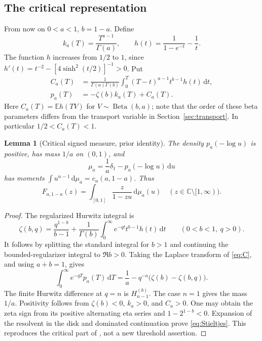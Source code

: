 \documentclass[11pt]{article}
\numberwithin{equation}{section}
\newtheorem{lemma}[theorem]{Lemma}
\theoremstyle{definition}\newtheorem{definition}[theorem]{Definition}
\theoremstyle{remark}\newtheorem{remark}[theorem]{Remark}
\newcommand{\dd}{\,\mathrm d}
\newcommand{\C}{\mathbb C}
\newcommand{\E}{\mathbb E}
\newcommand{\cut}{\C\setminus[1,\infty)}
\DeclareMathOperator{\Beta}{Beta}
\begin{document}
\subsection{The critical representation}
From now on $0<a<1$, $b=1-a$. Define
\begin{equation}\label{eq:hka}
 k_a(T)=\frac{T^{a-1}}{\Gamma(a)},\qquad
 h(t)=\frac1{1-e^{-t}}-\frac1t.
\end{equation}
The function $h$ increases from $1/2$ to $1$, since
$h'(t)=t^{-2}-[4\sinh^2(t/2)]^{-1}>0$.
Put
\begin{align}
 C_a(T)&=\frac1{\Gamma(a)\Gamma(b)}
       \int_0^T(T-t)^{a-1}t^{b-1}h(t)\dd t,
       \label{eq:C}\\
 p_a(T)&=-\zeta(b)k_a(T)+C_a(T).
       \label{eq:p}
\end{align}
Here $C_a(T)=\E h(TV)$ for $V\sim\Beta(b,a)$; note that the order of
these beta parameters differs from the transport variable in
Section~\ref{sec:transport}. In particular $1/2<C_a(T)<1$.

\begin{lemma}[Critical signed measure, prior identity]\label{lem:measure}
The density $p_a(-\log u)$ is positive, has mass $1/a$ on $(0,1)$,
and
\begin{equation}\label{eq:mu}
 \mu_a=\frac1a\delta_1-p_a(-\log u)\dd u
\end{equation}
has moments $\int u^{n-1}\dd\mu_a=c_n(a,1-a)$. Thus
\begin{equation}\label{eq:Stieltjes}
 F_{a,1-a}(z)=\int_{[0,1]}\frac{z}{1-zu}\dd\mu_a(u)
 \quad(z\in\cut).
\end{equation}
\end{lemma}
\begin{proof}
The regularized Hurwitz integral \cite{dlmf-hurwitz} is
\[
 \zeta(b,q)=\frac{q^{1-b}}{b-1}
 +\frac1{\Gamma(b)}\int_0^\infty e^{-qt}t^{b-1}h(t)\dd t
 \qquad(0<b<1,\ q>0).
\]
It follows by splitting the standard integral for $b>1$ and continuing
the bounded-regularizer integral to $\Re b>0$.
Taking the Laplace transform of \eqref{eq:C}, and using $a+b=1$,
gives
\begin{equation}\label{eq:plaplace}
 \int_0^\infty e^{-qT}p_a(T)\dd T
 =\frac1a-q^{-a}\bigl(\zeta(b)-\zeta(b,q)\bigr).
\end{equation}
The finite Hurwitz difference at $q=n$ is $H_{n-1}^{(b)}$.
The case $n=1$ gives the mass $1/a$. Positivity follows from
$\zeta(b)<0$, $k_a>0$, and $C_a>0$. One may obtain the zeta sign from
its positive alternating eta series and $1-2^{1-b}<0$.
Expansion of the resolvent in the disk and dominated continuation
prove \eqref{eq:Stieltjes}. This reproduces the critical part of
\cite[Theorem~3.1]{threshold}, not a new threshold assertion.
\end{proof}
\end{document}
